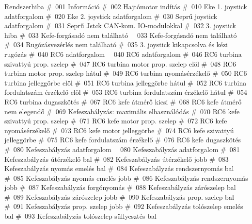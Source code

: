 	{Rendszerhiba}
	{\#\ 001 Információ}
	{\#\ 002 Hajtómotor indítás}
	{\#\ 010 Eke 1. joystick adatforgalom}
	{\#\ 020 Eke 2. joystick adatforgalom}
	{\#\ 030 Seprű joystick adatforgalom}
	{\#\ 031 Seprű Jstck CAN-kom. IO-modulokkal}
	{\#\ 032 3. joystick hiba}
	{\#\ 033 Kefe-forgásadó nem található}
	{\ \ 033 Kefe-forgásadó nem található}
	{\#\ 034 Rugózásvezérlés nem található}
	{\#\ 035 3. joystick kikapcsolva és kézi rugózás}
	{\#\ 040 RC6 adatforgalom}
	{\ \ 040 RC6 adatforgalom}
	{\#\ 046 RC6 turbina szivattyú prop. szelep}
	{\#\ 047 RC6 turbina motor prop. szelep elöl}
	{\#\ 048 RC6 turbina motor prop. szelep hátul}
	{\#\ 049 RC6 turbina nyomásérzékelő}
	{\#\ 050 RC6 turbina jelleggörbe elöl}
	{\#\ 051 RC6 turbina jelleggörbe hátul}
	{\#\ 052 RC6 turbina fordulatszám érzékelő elöl}
	{\#\ 053 RC6 turbina fordulatszám érzékelő hátul}
	{\#\ 054 RC6 turbina dugaszkötés}
	{\#\ 067 RC6 kefe átmérő kicsi}
	{\#\ 068 RC6 kefe átmérő nem elegendő}
	{\#\ 069 Kefeszabályzás: maximális elhasználódás}
	{\#\ 070 RC6 kefe szivattyú prop. szelep}
	{\#\ 071 RC6 kefe motor prop. szelep}
	{\#\ 072 RC6 kefe nyomásérzékelő}
	{\#\ 073 RC6 kefe motor jelleggörbe}
	{\#\ 074 RC6 kefe szivattyú jelleggörbe}
	{\#\ 075 RC6 kefe fordulatszám érzékelő}
	{\#\ 076 RC6 kefe dugaszkötés}
	{\#\ 080 Kefeszabályzás adatforgalom}
	{\ \ 080 Kefeszabályzás adatforgalom}
	{\#\ 081 Kefeszabályzás útérzékelő bal}
	{\#\ 082 Kefeszabályzás útérzékelő jobb}
	{\#\ 083 Kefeszabályzás nyomás emelés bal}
	{\#\ 084 Kefeszabályzás rendszernyomás bal}
	{\#\ 085 Kefeszabályzás nyomás emelés jobb}
	{\#\ 086 Kefeszabályzás rendszernyomás jobb}
	{\#\ 087 Kefeszabályzás forgónyomás}
	{\#\ 088 Kefeszabályzás zárószelep bal}
	{\#\ 089 Kefeszabályzás zárószelep jobb}
	{\#\ 090 Kefeszabályzás prop. szelep bal}
	{\#\ 091 Kefeszabályzás prop. szelep jobb}
	{\#\ 092 Kefeszabályzás tolószelep emelés bal}
	{\#\ 093 Kefeszabályzás tolószelep süllyesztés bal}
